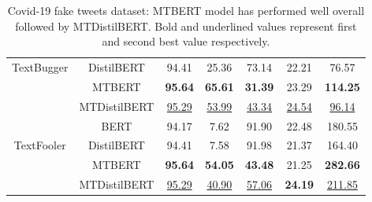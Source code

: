 \documentclass[%
	BCOR=8mm, %
	DIV=12,
	toc=bibliography, %
	toc=listof, %
	oneside, %
	egregdoesnotlikesansseriftitles, %
	]{scrbook}
\begin{document}
\begin{table}[H]
{\begin{tabular}{|c|c|c|c|c|c|c|}
TextBugger & DistilBERT &                94.41 &                    25.36 &                  73.14 &                     22.21 &            76.57 \\
                & MTBERT &               \textbf{95.64} &                    \textbf{65.61} &                  \textbf{31.39}&                     23.29 &           \textbf{114.25} \\
                & MTDistilBERT &                \underline{95.29} &                    \underline{53.99} &                  \underline{43.34} &                    \underline{24.54} &            \underline{96.14} \\
                \midrule
                 & BERT &                94.17 &                     7.62 &                  91.90 &                     22.48 &           180.55 \\
TextFooler & DistilBERT &                94.41 &                     7.58 &                  91.98 &                     21.37 &           164.40 \\
                & MTBERT &                \textbf{95.64} &                   \textbf{ 54.05} &                  \textbf{43.48} &                     21.25 &           \textbf{282.66} \\
                & MTDistilBERT &         \underline{95.29} &             \underline{40.90} &          \underline{57.06} &          \textbf{ 24.19} &     \underline{211.85} \\
                \bottomrule
        \end{tabular}
    }
    \caption[Experiment result of Covid-19 fake tweets]{Covid-19 fake tweets dataset: MTBERT model has performed well overall followed by MTDistilBERT. Bold and underlined values represent first and second best value respectively.}
    \label{table:FakeNewsExpRes}
\end{table}
\end{document}
